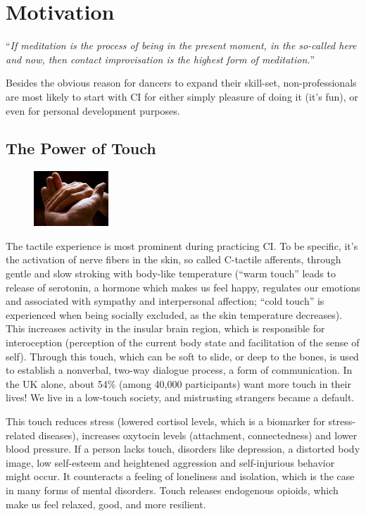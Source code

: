 

\section{Motivation}\label{sec:motivation}

``\textit{If meditation is the process of being in the present moment, in the so-called here and now, then contact improvisation is the highest form of meditation.}''

Besides the obvious reason for dancers to expand their skill-set, non-professionals are most likely to start with CI for either simply pleasure of doing it (it's fun), or even for personal development purposes.

\subsection{The Power of Touch}\label{subsec:the-power-of-touch}

\begin{figure}
\centering
\includegraphics[width=0.25\textwidth]{images/motivation}
\end{figure}

The tactile experience is most prominent during practicing CI. To be specific, it's the activation of nerve fibers in the skin, so called C-tactile afferents, through gentle and slow stroking with body-like temperature (``warm touch'' leads to release of serotonin, a hormone which makes us feel happy, regulates our emotions and associated with sympathy and interpersonal affection; ``cold touch'' is experienced when being socially excluded, as the skin temperature decreases).
This increases activity in the insular brain region, which is responsible for interoception (perception of the current body state and facilitation of the sense of self).
Through this touch, which can be soft to slide, or deep to the bones, is used to establish a nonverbal, two-way dialogue process, a form of communication.
In the UK alone, about 54\% (among 40,000 participants) want more touch in their lives!
We live in a low-touch society, and mistrusting strangers became a default.

This touch reduces stress (lowered cortisol levels, which is a biomarker for stress-related diseases), increases oxytocin levels (attachment, connectedness) and lower blood pressure.
If a person lacks touch, disorders like depression, a distorted body image, low self-esteem and heightened aggression and self-injurious behavior might occur.
It counteracts a feeling of loneliness and isolation, which is the case in many forms of mental disorders.
Touch releases endogenous opioids, which make us feel relaxed, good, and more resilient.


